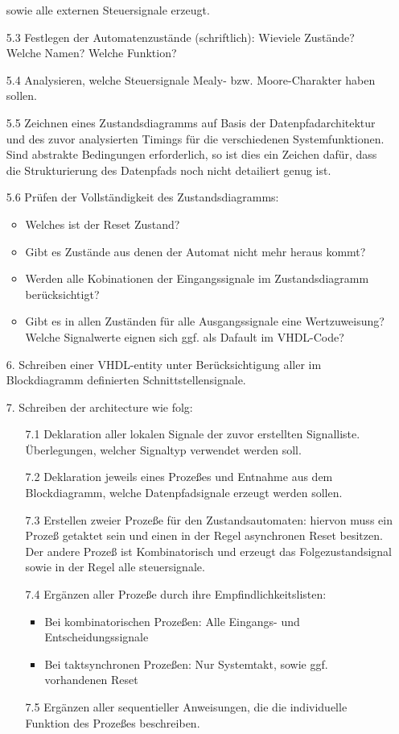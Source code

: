 \documentclass{article}
\begin{document}
\begin{itemize}
				sowie alle externen Steuersignale erzeugt.
	\item[5.3]	Festlegen der Automatenzustände (schriftlich):
				Wieviele Zustände?
				Welche Namen?
				Welche Funktion?
	\item[5.4]	Analysieren, welche Steuersignale Mealy- bzw. Moore-Charakter haben sollen.
	\item[5.5]	Zeichnen eines Zustandsdiagramms auf Basis der Datenpfadarchitektur und des zuvor 
				analysierten Timings für die verschiedenen Systemfunktionen. Sind abstrakte Bedingungen
				erforderlich, so ist dies ein Zeichen dafür, dass die Strukturierung des Datenpfads
				noch nicht detailiert genug ist.
	\item[5.6]	Prüfen der Vollständigkeit des Zustandsdiagramms:
		\begin{itemize}
			\item	Welches ist der Reset Zustand?
			\item 	Gibt es Zustände aus denen der Automat nicht mehr heraus kommt?
			\item 	Werden alle Kobinationen der Eingangssignale im Zustandsdiagramm berücksichtigt?
			\item 	Gibt es in allen Zuständen für alle Ausgangssignale eine Wertzuweisung?
					Welche Signalwerte eignen sich ggf. als Dafault im VHDL-Code?
		\end{itemize}
	 \item[6.]		Schreiben einer VHDL-entity unter Berücksichtigung aller im Blockdiagramm
	 				definierten Schnittstellensignale.
	 \item[7.]		Schreiben der architecture wie folg:
	 	\begin{itemize}
	 	  	\item[7.1]	Deklaration aller lokalen Signale der zuvor erstellten Signalliste. 
	 	  				Überlegungen, welcher Signaltyp verwendet werden soll.
	 	  	\item[7.2]	Deklaration jeweils eines Prozeßes und Entnahme aus dem Blockdiagramm, welche
	 	  				Datenpfadsignale erzeugt werden sollen.
	 	   	\item[7.3]	Erstellen zweier Prozeße für den Zustandsautomaten:
	 	   				hiervon muss ein Prozeß getaktet sein und einen in der Regel asynchronen
	 	   				Reset besitzen. Der andere Prozeß ist Kombinatorisch und erzeugt das
	 	   				Folgezustandsignal sowie in der Regel alle steuersignale.
	 	   	\item[7.4]	Ergänzen aller Prozeße durch ihre Empfindlichkeitslisten:
	 	   		\begin{itemize}
	 	   			\item	Bei kombinatorischen Prozeßen: Alle Eingangs- und Entscheidungssignale
	 	   			\item 	Bei taktsynchronen Prozeßen: Nur Systemtakt, sowie ggf. vorhandenen Reset
	 	   		\end{itemize}
	 	   	\item[7.5]	Ergänzen aller sequentieller Anweisungen, die die individuelle Funktion des
	 	   				Prozeßes beschreiben.
	 	\end{itemize}
\end{itemize}
\end{document}
